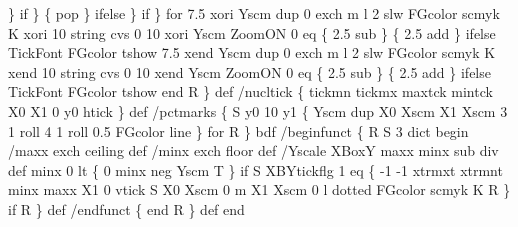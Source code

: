 \documentclass[11pt]{article}
\def\nwendcode{\endtrivlist \endgroup} %
\let\nwdocspar=\par                    %
\begin{document}
            \} if
          \} \{
            pop
          \} ifelse
        \} if
      \} for
    7.5 xori Yscm dup 0 exch m l 2 slw FGcolor scmyk K
    xori 10 string cvs 0 10 xori Yscm
    ZoomON 0 eq \{ 2.5 sub \} \{ 2.5 add \} ifelse
    TickFont FGcolor tshow 7.5 xend Yscm dup 0 exch m l
    2 slw FGcolor scmyk K xend 10 string cvs 0 10 xend Yscm
    ZoomON 0 eq \{ 2.5 sub \} \{ 2.5 add \} ifelse
    TickFont FGcolor tshow end
  R \} def
/nucltick \{ tickmn tickmx maxtck mintck X0 X1 0 y0 htick \} def
/pctmarks \{
  S y0 10 y1 \{
      Yscm dup X0 Xscm X1 Xscm 3 1 roll 4 1 roll 0.5 FGcolor line
      \} for
  R \} bdf
%
/beginfunct \{
  R S 3 dict begin
    /maxx exch ceiling def /minx exch floor def
    /Yscale XBoxY maxx minx sub div def
    minx 0 lt \{ 0 minx neg Yscm T \} if
    S XBYtickflg 1 eq \{
        -1 -1 xtrmxt xtrmnt minx maxx X1 0 vtick
        S X0 Xscm 0 m X1 Xscm 0 l dotted FGcolor scmyk K R
        \} if
    R
  \} def /endfunct \{ end R \} def
end %
%
%
\nwendcode{}\nwdocspar

\end{document}
